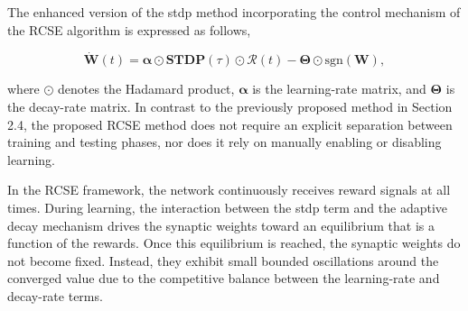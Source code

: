 


The enhanced version of the \ac{stdp} method incorporating the control mechanism of the \ac{RCSE} algorithm is expressed as follows,

\begin{equation} \label{Eq.WS.4}
    \dot{\bm{W}}(t) = \bm{\alpha} \odot \textbf{STDP}(\tau) \odot \mathcal{R}(t)
    - \bm{\Theta} \odot \text{sgn}(\bm{W}),
\end{equation}

\noindent
where $\odot$ denotes the Hadamard product, $\bm{\alpha}$ is the learning-rate matrix, and $\bm{\Theta}$ is the decay-rate matrix. In contrast to the previously proposed method in Section 2.4, the proposed \ac{RCSE} method does not require an explicit separation between training and testing phases, nor does it rely on manually enabling or disabling learning.

In the \ac{RCSE} framework, the network continuously receives reward signals at all times. During learning, the interaction between the \ac{stdp} term and the adaptive decay mechanism drives the synaptic weights toward an equilibrium that is a function of the rewards. Once this equilibrium is reached, the synaptic weights do not become fixed. Instead, they exhibit small bounded oscillations around the converged value due to the competitive balance between the learning-rate and decay-rate terms.

